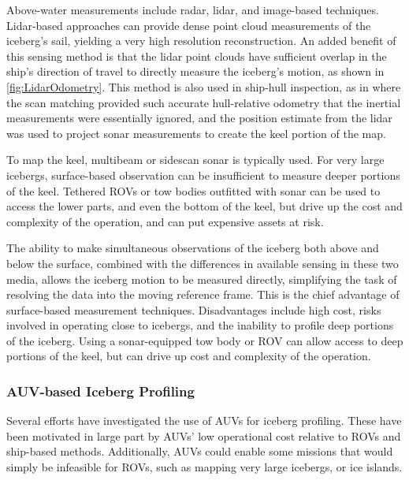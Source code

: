 Above-water measurements include radar, lidar, and image-based techniques. Lidar-based approaches can provide dense point cloud measurements of the iceberg's sail, yielding a very high resolution reconstruction. An added benefit of this sensing method is that the lidar point clouds have sufficient overlap in the ship's direction of travel to directly measure the iceberg's motion, as shown in \ref{fig:LidarOdometry}. This method is also used in ship-hull inspection, as in \cite{Singapore} where the scan matching provided such accurate hull-relative odometry that the inertial measurements were essentially ignored, and the position estimate from the lidar was used to project sonar measurements to create the keel portion of the map.

To map the keel, multibeam or sidescan sonar is typically used. For very large icebergs, surface-based observation can be insufficient to measure deeper portions of the keel. Tethered ROVs or tow bodies outfitted with sonar can be used to access the lower parts, and even the bottom of the keel, but drive up the cost and complexity of the operation, and can put expensive assets at risk. 

The ability to make simultaneous observations of the iceberg both above and below the surface, combined with the differences in available sensing in these two media, allows the iceberg motion to be measured directly, simplifying the task of resolving the data into the moving reference frame. This is the chief advantage of surface-based measurement techniques. Disadvantages include high cost, risks involved in operating close to icebergs, and the inability to profile deep portions of the iceberg. Using a sonar-equipped tow body or ROV can allow access to deep portions of the keel, but can drive up cost and complexity of the operation. 


\subsubsection{AUV-based Iceberg Profiling}

Several efforts have investigated the use of AUVs for iceberg profiling. These have been motivated in large part by AUVs' low operational cost relative to ROVs and ship-based methods. Additionally, AUVs could enable some missions that would simply be infeasible for ROVs, such as mapping very large icebergs, or ice islands. 


